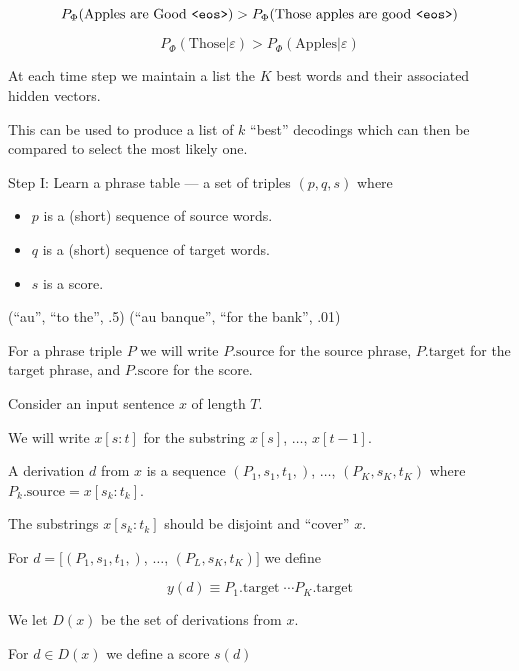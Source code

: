 {\vfill
$$P_\Phi(\mbox{Apples are Good {\tt <eos>}}) > P_\Phi(\mbox{Those apples are good {\tt <eos>}})$$

\vfill
$$P_\Phi(\mbox{Those}|\varepsilon) > P_\Phi(\mbox{Apples}|\varepsilon)$$
    

At each time step we maintain a list the $K$ best words and their associated hidden vectors.

\vfill
This can be used to produce a list of $k$ ``best'' decodings which can then be compared to select
the most likely one.


Step I:   Learn a phrase table --- a set of triples $(p,q,s)$ where

\vfill
\begin{itemize}
\item $p$ is a (short) sequence of source words.
  \vfill
\item $q$ is a (short) sequence of target words.
  \vfill
\item $s$ is a score.
\end{itemize}

\vfill
(``au'', ``to the'', .5) \hfill (``au banque'', ``for the bank'', .01)

\vfill
For a phrase triple $P$ we will write $P.\mathrm{source}$ for the source phrase, $P.\mathrm{target}$ for the target phrase, and $P.\mathrm{score}$ for the score.


Consider an input sentence $x$ of length $T$.

\vfill
We will write $x[s:t]$ for the substring $x[s]$, $\ldots$, $x[t-1]$.

\vfill
A derivation $d$ from $x$ is a sequence $(P_1,s_1,t_1,)$, $\ldots$, $(P_K,s_K,t_K)$ where $P_k.\mathrm{source} = x[s_k:t_k]$.

\vfill
The substrings $x[s_k:t_k]$ should be disjoint and ``cover'' $x$.

\vfill
For $d = [(P_1,s_1,t_1,)$, $\ldots$, $(P_L,s_K,t_K)]$ we define

$$ y(d) \equiv P_1.\mathrm{target}\;\cdots P_K.\mathrm{target}$$

\vfill
We let $D(x)$ be the set of derivations from $x$.


For $d \in D(x)$ we define a score $s(d)$

}
